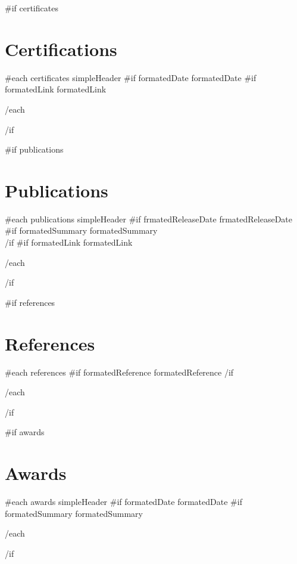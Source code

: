 \documentclass{article}
\begin{document}
{{#if certificates}}\section*{Certifications}{
  {{#each certificates}}
    {{ simpleHeader }}\newline
    {{#if formatedDate}}{{ formatedDate }}
    {{#if formatedLink}}{{ formatedLink }}
    \par
  {{/each}}
}{{/if}}

{{#if publications}}\section*{Publications}{
  {{#each publications}}
    {{ simpleHeader }}\newline
    {{#if frmatedReleaseDate}}{{ frmatedReleaseDate }}
    {{#if formatedSummary}}
      {{ formatedSummary }}
      \\
    {{/if}}
    {{#if formatedLink}}{{ formatedLink }}
    \par
  {{/each}}
}{{/if}}

{{#if references}}
\section*{References} {
  {{#each references}}
    {{#if formatedReference}}{{ formatedReference }}{{/if}}
    \par
  {{/each}}
}{{/if}}

{{#if awards}}\section*{Awards}{
  {{#each awards}}
    {{ simpleHeader }}\newline
    {{#if formatedDate}}{{ formatedDate }}
    {{#if formatedSummary}}{{ formatedSummary }}
    \par
  {{/each}}
}{{/if}}
\end{document}
